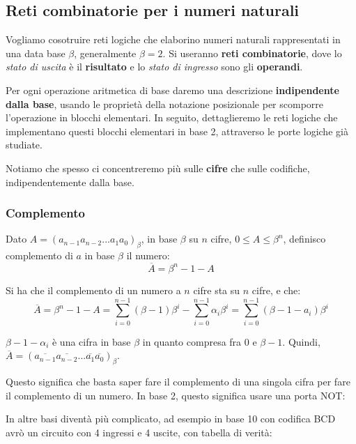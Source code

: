 \documentclass[a4paper,11pt]{article}
\begin{document}
\subsection{Reti combinatorie per i numeri naturali}
Vogliamo cosotruire reti logiche che elaborino numeri naturali rappresentati in una data base $\beta$, generalmente $\beta = 2$.
Si useranno \textbf{reti combinatorie}, dove lo \textit{stato di uscita} è il \textbf{risultato} e lo \textit{stato di ingresso} sono gli \textbf{operandi}.

Per ogni operazione aritmetica di base daremo una descrizione \textbf{indipendente dalla base}, usando le proprietà della notazione posizionale per scomporre l'operazione in blocchi elementari.
In seguito, dettaglieremo le reti logiche che implementano questi blocchi elementari in base 2, attraverso le porte logiche già studiate.

Notiamo che spesso ci concentreremo più sulle \textbf{cifre} che sulle codifiche, indipendentemente dalla base.

\subsubsection{Complemento}
Dato $A = (a_{n-1} a_{n-2} ... a_1 a_0)_\beta$, in base $\beta$ su $n$ cifre, $0 \leq A \leq \beta^n$, definisco complemento di $a$ in base $\beta$ il numero:
$$
\overline{A} = \beta^n - 1 - A
$$

Si ha che il complemento di un numero a $n$ cifre sta su $n$ cifre,  e che:
$$
\overline{A} = \beta^n - 1 - A = \sum_{i=0}^{n-1} (\beta - 1) \beta^i - \sum_{i=0}^{n-1} \alpha_i \beta^i = \sum_{i = 0}^{n-1} (\beta - 1 - a_i)\beta^i
$$

$\beta - 1 -\alpha_i$ è una cifra in base $\beta$ in quanto compresa fra $0$ e $\beta - 1$.
Quindi, $\overline{A} = (\overline{a_{n-1}} \overline{a_{n-2}} ... \overline{a_{1}} \overline{a_{0}})_\beta$.

Questo significa che basta saper fare il complemento di una singola cifra per fare il complemento di un numero.
In base 2, questo significa usare una porta NOT:



In altre basi diventà più complicato, ad esempio in base 10 con codifica BCD avrò un circuito con 4 ingressi e 4 uscite, con tabella di verità:
\end{document}
